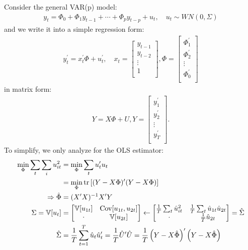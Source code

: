 Consider the general VAR(p) model:
\begin{gather}\label{eq:varest}
    y_t = \Phi_0 + \Phi_1 y_{t-1} + \cdots + \Phi_p y_{t-p} + u_t, \quad u_t \sim WN(0, \Sigma)
\end{gather}
and we write it into a simple regression form:
\begin{gather*}
    y_t^{\prime} = x_t^{\prime} \Phi + u_t^{\prime}, \quad x_t = \begin{bmatrix}
         y_{t-1} \\
         y_{t-2} \\
         \vdots \\
         1 \\
    \end{bmatrix}, \Phi = \begin{bmatrix}
         \Phi_1^{\prime} \\
         \Phi_2^{\prime} \\
         \vdots \\
         \Phi_0^{\prime} \\
    \end{bmatrix}
\end{gather*}
in matrix form:
\begin{gather*}
    Y = X \Phi + U, Y = \begin{bmatrix}
         y_1^{\prime} \\
         y_2^{\prime} \\
         \vdots \\
         y_T^{\prime} \\
    \end{bmatrix}.
\end{gather*}
To simplify, we only analyze for the OLS estimator:
\begin{align*}
    \min_{\Phi} \sum_{t} \sum_{i} u_{it}^2 &= \min_{\Phi} \sum_{t} u_t^{\prime} u_t \\
    &= \min_{\Phi} \operatorname{tr}\left[ (Y - X\Phi)^{\prime} (Y - X\Phi) \right] \\
    \Rightarrow \hat{\Phi} &= (X^{\prime} X)^{-1} X^{\prime} Y \\
    \Sigma = \mathbb{V}[u_t] &= \begin{bmatrix}
        \mathbb{V}[u_{1t}] & \operatorname{Cov}[u_{1t}, u_{2t}] \\
        \cdot &  \mathbb{V}[u_{2t}] \\
    \end{bmatrix} \leftarrow \begin{bmatrix}
        \frac{1}{T} \sum_{t} \hat{u}_{it}^2 & \frac{1}{T} \sum_{t} \hat{u}_{1t} \hat{u}_{2t} \\
        \cdot & \frac{1}{T} \hat{u}_{2t} \\
    \end{bmatrix} = \hat{\Sigma} \\
    \hat{\Sigma} &= \frac{1}{T} \sum_{t=1}^{T} \hat{u}_t \hat{u}_t^{\prime} = \frac{1}{T} \hat{U}^{\prime} \hat{U} = \frac{1}{T} \left(Y - X \hat{\Phi} \right)^{\prime} \left(Y - X \hat{\Phi} \right)
\end{align*}


